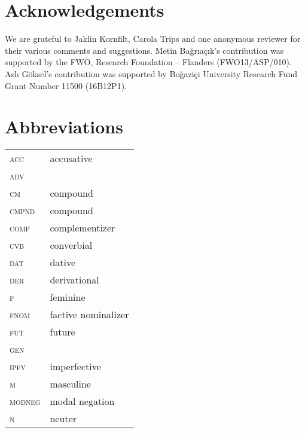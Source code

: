 \documentclass[output=paper]{LSP/langsci}
\begin{document}
\section*{Acknowledgements}
We are grateful to Jaklin Kornfilt, Carola Trips and one anonymous reviewer for their various comments and suggestions.  Metin Bağrıaçık's contribution was supported by the FWO, Research Foundation -- Flanders (FWO13/ASP/010). Aslı Göksel's contribution was supported by Boğaziçi  University Research Fund Grant Number 11500 (16B12P1).

\section*{Abbreviations}
\begin{tabularx}{.45\textwidth}{lQ}
\textsc{acc} &  accusative    \\
\textsc{adv} &     \\
\textsc{cm} &  compound  \\
\textsc{cmpnd} &  compound   \\
\textsc{comp} &  complementizer \\
\textsc{cvb} &  converbial    \\
\textsc{dat} &  dative      \\
\textsc{der} &  derivational  \\
\textsc{f} &  feminine      \\
\textsc{fnom} &  factive nominalizer\\
\textsc{fut} &  future      \\
\textsc{gen} &       \\
\textsc{ipfv} &  imperfective   \\
\textsc{m} &  masculine     \\
\textsc{modneg} &  modal negation\\
\textsc{n} &  neuter       \\
\end{tabularx}
\end{document}
